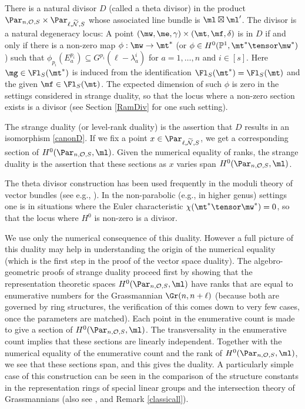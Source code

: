 There is a natural divisor $D$ (called a theta divisor)  in the product $\Par_{n,\mathcal{O},S}\times \Par_{\ell,\widetilde{\mathcal{N}},S}$ whose associated line bundle is $\ml\boxtimes\ml'$. The divisor is a natural degeneracy locus: A point $(\mw,\me,\gamma)\times (\mt,\mf,\delta)$ is in $D$ if and only if there is a non-zero map $\phi:\mw\to \mt^*$ (or $\phi\in H^0(\Bbb{P}^1,\mt^*\tensor \mw^*)$) such that  $\phi_{p_i}(E^{p_i}_a)\subseteq G^{p_i}(\ell-\lambda^i_a)$ for $a=1,\dots,n$ and $i\in [s]$. Here $\mg\in \Fl_S(\mt^*)$ is induced from the identification  $\Fl_S(\mt^*)= \Fl_S(\mt)$ and the given $\mf\in\Fl_S(\mt)$. The expected dimension of such $\phi$ is zero in the settings considered in strange duality, so that the locus where a non-zero section exists is a divisor (see Section \ref{RamDiv} for one such setting).

The strange duality (or level-rank duality) is the assertion that $D$ results in an isomorphism
\eqref{canonD}. If we fix a point $x\in\Par_{\ell,\widetilde{\mathcal{N}},S}$, we get a corresponding section of $H^0(\Par_{n,\mathcal{O},S},\ml)$. Given the numerical equality of ranks, the strange duality is the assertion that  these sections as $x$ varies span $H^0(\Par_{n,\mathcal{O},S},\ml)$.


The theta divisor construction has been used frequently in the moduli theory of vector bundles (see e.g., \cite{Faltings}). In the non-parabolic (e.g., in higher genus) settings one is in situations where the Euler characteristic $\chi(\mt^*\tensor \mw^*)=0$, so that the locus where $H^0$ is non-zero is a divisor.

We  use only the numerical consequence of this duality. However a full picture of this duality may help in understanding the origin of the numerical equality (which is the first step in the proof of the vector space duality). The algebro-geometric proofs of strange duality proceed first by showing that the representation
theoretic spaces $H^0(\Par_{n,\mathcal{O},S},\ml)$ have ranks that are equal to enumerative numbers for the Grassmannian $\Gr(n,n+\ell)$ (because both are governed by ring structures,  the verification of this
comes down to very few cases, once the parameters are matched). Each point in the enumerative count is made to  give a section of $H^0(\Par_{n,\mathcal{O},S},\ml)$. The transversality in the enumerative count implies that these sections are linearly independent. Together with the numerical equality of the enumerative count and the rank of  $H^0(\Par_{n,\mathcal{O},S},\ml)$, we see that these sections span, and this gives the duality. A particularly simple case of this construction can be seen in the comparison of the structure constants in the representation rings of special linear groups and the intersection theory of Grassmannians \cite{BIMRN} (also see \cite[Section 6.2]{FBull}, and Remark \ref{classicall}).


